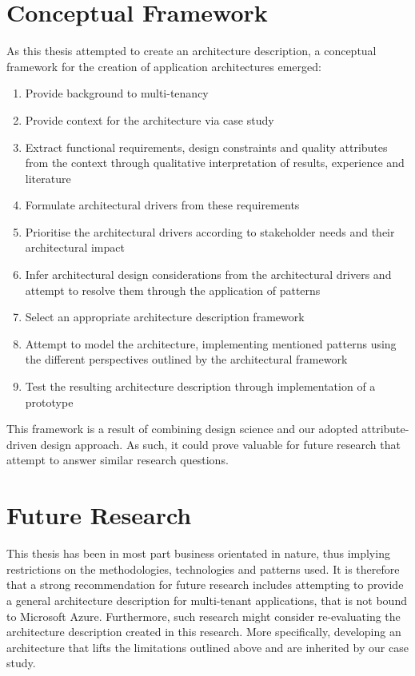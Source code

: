 \section{Conceptual Framework}
As this thesis attempted to create an architecture description, a conceptual framework for the creation of application architectures emerged:
\begin{enumerate}
\item Provide background to multi-tenancy
\item Provide context for the architecture via case study
\item Extract functional requirements, design constraints and quality attributes from the context through qualitative interpretation of results, experience and literature
\item Formulate architectural drivers from these requirements
\item Prioritise the architectural drivers according to stakeholder needs and their architectural impact
\item Infer architectural design considerations from the architectural drivers and attempt to resolve them through the application of patterns
\item Select an appropriate architecture description framework
\item Attempt to model the architecture, implementing mentioned patterns using the different perspectives outlined by the architectural framework
\item Test the resulting architecture description through implementation of a prototype
\end{enumerate}
This framework is a result of combining design science and our adopted attribute-driven design approach. As such, it could prove valuable for future research that attempt to answer similar research questions. 

\section{Future Research}
This thesis has been in most part business orientated in nature, thus implying  restrictions on the methodologies, technologies and patterns used. It is therefore that a strong recommendation for future research includes attempting to provide a general architecture description for multi-tenant applications, that is not bound to Microsoft Azure. Furthermore, such research might consider re-evaluating the architecture description created in this research. More specifically, developing an architecture that lifts the limitations outlined above and are inherited by our case study. 

